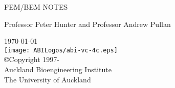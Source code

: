 \thispagestyle{empty}

\begin{center}
   \huge FEM/BEM NOTES
   \vspace{10mm}   


   \vspace{80mm}   
   \large   
      Professor Peter Hunter and Professor Andrew Pullan\\   
   \vspace{30mm}   
   
   \normalsize   
   \today\\   %

   \large
   \vspace{30mm}
   \texttt{[image: ABILogos/abi-vc-4c.eps]}\\   
   \vspace{10mm}
   \small
   \copyright \thickspace Copyright 1997-\the\year \\
   Auckland Bioengineering Institute\\
   The University of Auckland
\end{center}




